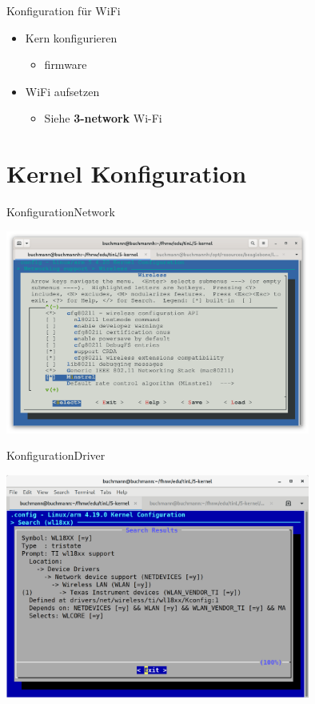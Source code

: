 \begin{frame}{Konfiguration für WiFi}
\begin{itemize}
 \item Kern konfigurieren
 \begin{itemize}
  \item firmware
 \end{itemize}
 \item WiFi aufsetzen
 \begin{itemize}
  \item Siehe {\bf 3-network} Wi-Fi 
 \end{itemize}
\end{itemize}
\end{frame}

\section{Kernel Konfiguration}

\begin{frame}{Konfiguration}{Network}
\begin{center}
\includegraphics[width=0.75\textwidth]{wireless.png}
\end{center}
\end{frame}

\begin{frame}{Konfiguration}{Driver}
\begin{center}
\includegraphics[width=0.75\textwidth]{wl18xx.png}
\end{center}
\end{frame}

